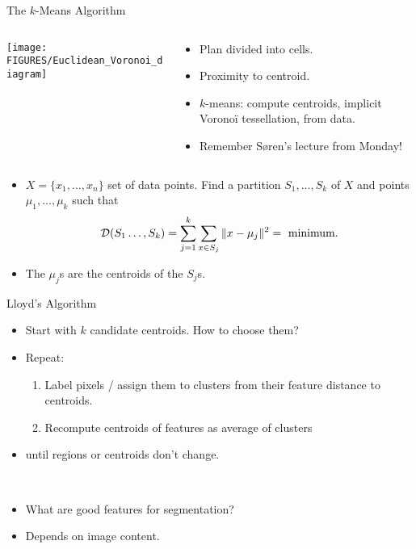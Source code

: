 \documentclass[9pt]{beamer}
\begin{document}
\begin{frame}[t]{The $k$-Means Algorithm}
  \begin{columns}
    \begin{column}{0.4\textwidth}
      \begin{center}
        \texttt{[image: FIGURES/Euclidean\_Voronoi\_diagram]}
      \end{center}
    \end{column}
    \begin{column}{0.6\textwidth}
      \begin{itemize}
      \item Plan divided into cells.
      \item Proximity to centroid.
      \item $k$-means: compute centroids, implicit Vorono{\"i} tessellation, from data.
      \item Remember S{\o}ren's lecture from Monday!
      \end{itemize}
    \end{column}
  \end{columns}
  \begin{itemize}
  \item $X = \{x_1,\dots,x_n\}$ set of data points. Find a partition $S_1,\dots,S_k$ of $X$ and points $\mu_1,\dots,\mu_k$ such that
    $$
    {\mathcal D}(S_1\dots,S_k) = \sum_{j=1}^k\sum_{x\in S_j}\|x-\mu_j\|^2 = \text{ minimum}.
    $$
  \item The $\mu_j$s are the centroids of the $S_j$s.
  \end{itemize}
\end{frame}



\begin{frame}[t]{Lloyd's Algorithm}
  \begin{itemize}
  \item Start with $k$ candidate centroids. How to choose them?
  \item Repeat:
    \begin{enumerate}
    \item Label pixels / assign them to clusters from their feature distance to centroids.
    \item Recompute centroids of features as average of clusters
    \end{enumerate}
  \item until regions or centroids don't change.
  \end{itemize}
  ~\\
  \begin{itemize}
  \item What are good features for segmentation?
  \item Depends on image content.
  \end{itemize}
\end{frame}
\end{document}
